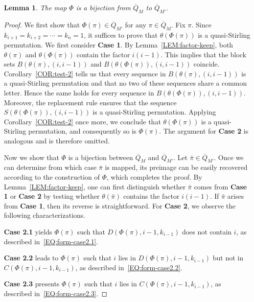 \documentclass[11pt]{article}
\numberwithin{equation}{section}
\newtheorem{lem}[thm]{Lemma}
\def\oQ{\overline{Q}}
\begin{document}
\begin{lem}
	The map $\Phi$ is a bijection from $\oQ_M$ to $\oQ_{M'}$.
\end{lem}
\begin{proof}	
	We first show that $\Phi(\pi)\in \oQ_{M'}$ for any $\pi\in \oQ_M$. Fix $\pi$. Since $k_{i+1}=k_{i+2}=\cdots=k_n=1$, it suffices to prove that $\theta(\Phi(\pi))$ is a quasi-Stirling permutation. We first consider \textbf{Case 1}. By Lemma~\ref{LEM:factor-keep}, both $\theta(\pi)$ and $\theta(\Phi(\pi))$ contain the factor $i(i-1)$. This implies that the block sets $B(\theta(\pi),(i,i-1))$ and $B(\theta(\Phi(\pi)),(i,i-1))$ coincide. Corollary~\ref{COR:test-2} tells us that every sequence in $B(\theta(\pi),(i,i-1))$ is a quasi-Stirling permutation and that no two of these sequences share a common letter. Hence the same holds for every sequence in $B(\theta(\Phi(\pi)),(i,i-1))$. Moreover, the replacement rule ensures that the sequence $S(\theta(\Phi(\pi)),(i,i-1))$ is a quasi-Stirling permutation. Applying Corollary~\ref{COR:test-2} once more, we conclude that $\theta(\Phi(\pi))$ is a quasi-Stirling permutation, and consequently so is $\Phi(\pi)$. The argument for \textbf{Case 2} is analogous and is therefore omitted.
	
	
	Now we show that $\Phi$ is a bijection between $\oQ_M$ and $\oQ_{M'}$. Let $\bar{\pi}\in\oQ_{M'}$. Once we can determine from which case $\bar{\pi}$ is mapped, its preimage can be easily recovered according to the construction of $\Phi$, which completes the proof. By Lemma~\ref{LEM:factor-keep}, one can first distinguish whether $\bar{\pi}$ comes from \textbf{Case 1} or \textbf{Case 2} by testing whether $\theta(\bar{\pi})$ contains the factor $i(i-1)$. If $\bar{\pi}$ arises from \textbf{Case 1}, then its reverse is straightforward. For \textbf{Case 2}, we observe the following characterizations.
	
	\noindent\textbf{Case 2.1} yields $\Phi(\pi)$ such that $D(\Phi(\pi),i-1,k_{i-1})$ does not contain $i$, as described in~\eqref{EQ:form-case2.1}.
	
	\noindent\textbf{Case 2.2} leads to $\Phi(\pi)$ such that $i$ lies in $D(\Phi(\pi),i-1,k_{i-1})$ but not in $C(\Phi(\pi),i-1,k_{i-1})$, as described in~\eqref{EQ:form-case2.2}.
	
	\noindent\textbf{Case 2.3} presents $\Phi(\pi)$ such that $i$ lies in $C(\Phi(\pi),i-1,k_{i-1})$, as described in~\eqref{EQ:form-case2.3}.
\end{proof}
\end{document}
